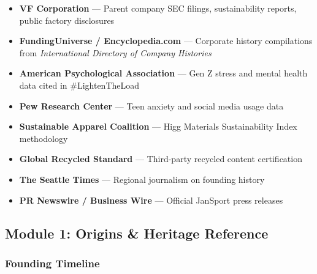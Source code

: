 \documentclass[11pt,letterpaper]{article}
\begin{document}
\begin{itemize}[nosep]
  \item \textbf{VF Corporation} --- Parent company SEC filings, sustainability reports, public factory disclosures
  \item \textbf{FundingUniverse / Encyclopedia.com} --- Corporate history compilations from \textit{International Directory of Company Histories}
  \item \textbf{American Psychological Association} --- Gen Z stress and mental health data cited in \#LightenTheLoad
  \item \textbf{Pew Research Center} --- Teen anxiety and social media usage data
  \item \textbf{Sustainable Apparel Coalition} --- Higg Materials Sustainability Index methodology
  \item \textbf{Global Recycled Standard} --- Third-party recycled content certification
  \item \textbf{The Seattle Times} --- Regional journalism on founding history
  \item \textbf{PR Newswire / Business Wire} --- Official JanSport press releases
\end{itemize}

\subsection{Module 1: Origins \& Heritage Reference}

\subsubsection{Founding Timeline}
\end{document}
